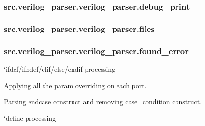\hypertarget{classsrc_1_1verilog__parser_1_1verilog__parser_a2f62555a692365df5e08fda3b4869c82}{
\subsubsection[{debug\-\_\-print}]{\setlength{\rightskip}{0pt plus 5cm}src.\-verilog\-\_\-parser.\-verilog\-\_\-parser.\-debug\-\_\-print}}\label{classsrc_1_1verilog__parser_1_1verilog__parser_a2f62555a692365df5e08fda3b4869c82}
\hypertarget{classsrc_1_1verilog__parser_1_1verilog__parser_a7f17d4fbfa695ef7dd9a846135434690}{
\subsubsection[{files}]{\setlength{\rightskip}{0pt plus 5cm}src.\-verilog\-\_\-parser.\-verilog\-\_\-parser.\-files}}\label{classsrc_1_1verilog__parser_1_1verilog__parser_a7f17d4fbfa695ef7dd9a846135434690}
\hypertarget{classsrc_1_1verilog__parser_1_1verilog__parser_a259774d2a3cc74fd78518fcaabf3867e}{
\subsubsection[{found\-\_\-error}]{\setlength{\rightskip}{0pt plus 5cm}src.\-verilog\-\_\-parser.\-verilog\-\_\-parser.\-found\-\_\-error}}\label{classsrc_1_1verilog__parser_1_1verilog__parser_a259774d2a3cc74fd78518fcaabf3867e}


`ifdef/ifndef/elif/else/endif processing 

Applying all the param overriding on each port.

Parsing endcase construct and removing case\-\_\-condition construct.

`define processing

